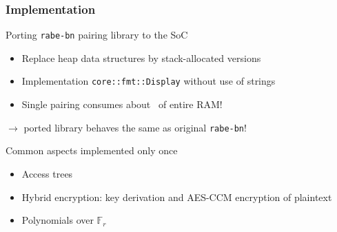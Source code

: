 \begin{frame}[c, fragile]
    \frametitle{Implementation}
    \begin{block}{Porting \texttt{rabe-bn} pairing library to the SoC}
        \begin{itemize}
            \item Replace heap data structures by stack-allocated versions
            \item Implementation \verb+core::fmt::Display+ without use of strings
            \item Single pairing consumes about \textonequarter ~of entire RAM!
        \end{itemize} 
        \pause
        \begin{center}
            \alert{\large $\rightarrow$ ported library behaves the same as original \texttt{rabe-bn}!}
        \end{center}
    \end{block}
    \pause
    \begin{block}{Common aspects implemented only once}
        \begin{itemize}
            \item Access trees
            \item Hybrid encryption: key derivation and AES-CCM encryption of plaintext
            \item Polynomials over $\mathbb{F}_r$
        \end{itemize}
    \end{block}

\end{frame}

